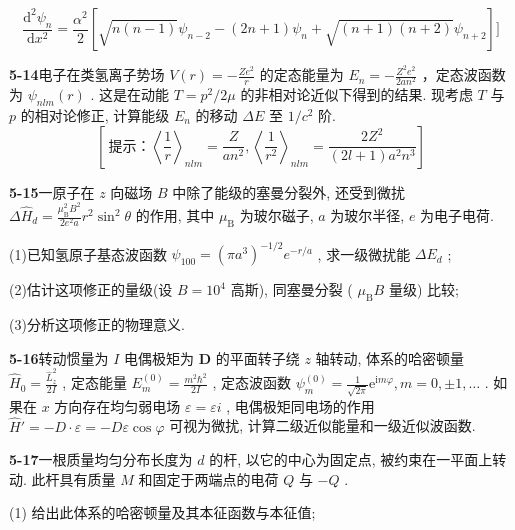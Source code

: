 $$
\frac {\mathrm{d} ^ {2} \psi_ {n}}{\mathrm{d} x ^ {2}} = \frac {\alpha^ {2}}{2} \left[ \sqrt {n (n - 1)} \psi_ {n - 2} - (2 n + 1) \psi_ {n} + \sqrt {(n + 1) (n + 2)} \psi_ {n + 2} \right] ]
$$

\vfill

\newpage
\vfill

\noindent
\textbf{5-14}\quad 电子在类氢离子势场 $V(r) = -\frac{Ze^2}{r}$ 的定态能量为 $E_{n} = -\frac{Z^{2}e^{2}}{2an^{2}}$ ，定态波函数为 $\psi_{nlm}(r)$ . 这是在动能 $T = p^{2} / 2\mu$ 的非相对论近似下得到的结果. 现考虑 $T$ 与 $p$ 的相对论修正, 计算能级 $E_{n}$ 的移动 $\Delta E$ 至 $1 / c^{2}$ 阶.
$$
\left[\ \text{提示：} \left\langle \frac {1}{r} \right\rangle_ {n l m} = \frac {Z}{a n ^ {2}}, \left\langle \frac {1}{r ^ {2}} \right\rangle_ {n l m} = \frac {2 Z ^ {2}}{(2 l + 1) a ^ {2} n ^ {3}} \right]
$$

\vfill

\newpage
\vfill

\noindent
\textbf{5-15}\quad 一原子在 $z$ 向磁场 $B$ 中除了能级的塞曼分裂外, 还受到微扰 $\Delta \hat{H}_d = \frac{\mu_{\mathrm{B}}^2 B^2}{2e^2 a} r^2 \sin^2 \theta$ 的作用, 其中 $\mu_{\mathrm{B}}$ 为玻尔磁子, $a$ 为玻尔半径, $e$ 为电子电荷. 

(1)已知氢原子基态波函数 $\psi_{100} = (\pi a^3)^{-1/2} e^{-r/a}$ , 求一级微扰能 $\Delta E_d$ ; 

(2)估计这项修正的量级(设 $B = 10^4$ 高斯), 同塞曼分裂 ( $\mu_{\mathrm{B}} B$ 量级) 比较; 

(3)分析这项修正的物理意义.

\vfill

\newpage
\vfill

\noindent
\textbf{5-16}\quad 转动惯量为 $I$ 电偶极矩为 $\pmb{D}$ 的平面转子绕 $z$ 轴转动, 体系的哈密顿量 $\hat{H}_0 = \frac{\hat{L}_z^2}{2I}$ , 定态能量 $E_m^{(0)} = \frac{m^2\hbar^2}{2I}$ , 定态波函数 $\psi_m^{(0)} = \frac{1}{\sqrt{2\pi}}\mathrm{e}^{\mathrm{i}m\varphi}, m = 0, \pm 1, \dots$ . 如果在 $x$ 方向存在均匀弱电场 $\varepsilon = \varepsilon i$ , 电偶极矩同电场的作用 $\hat{H}' = -D\cdot \varepsilon = -D\varepsilon \cos \varphi$ 可视为微扰, 计算二级近似能量和一级近似波函数.

\vfill

\newpage
\vfill

\noindent
\textbf{5-17}\quad 一根质量均匀分布长度为 $d$ 的杆, 以它的中心为固定点, 被约束在一平面上转动. 此杆具有质量 $M$ 和固定于两端点的电荷 $Q$ 与 $-Q$ . 

(1) 给出此体系的哈密顿量及其本征函数与本征值; 

